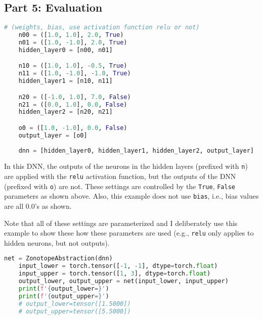 \subsection{Part 5: Evaluation}


\begin{lstlisting}[language=Python]
    # (weights, bias, use activation function relu or not)
    n00 = ([1.0, 1.0], 2.0, True)
    n01 = ([1.0, -1.0], 2.0, True)
    hidden_layer0 = [n00, n01]

    n10 = ([1.0, 1.0], -0.5, True)
    n11 = ([1.0, -1.0], -1.0, True)
    hidden_layer1 = [n10, n11]

    n20 = ([-1.0, 1.0], 7.0, False)
    n21 = ([0.0, 1.0], 0.0, False)
    hidden_layer2 = [n20, n21]

    o0 = ([1.0, -1.0], 0.0, False)
    output_layer = [o0]
    
    dnn = [hidden_layer0, hidden_layer1, hidden_layer2, output_layer]
\end{lstlisting}

In this DNN, the outputs of the neurons in the hidden layers (prefixed with \texttt{n}) are applied with the \texttt{relu} activation function, but the outputs of the DNN (prefixed with \texttt{o}) are not.  These settings are controlled by the \texttt{True}, \texttt{False} parameters as shown above.  Also, this example does not use \texttt{bias}, i.e., bias values are all 0.0's as shown. 

Note that all of these settings are parameterized and I deliberately use this example to show these how these parameters are used (e.g., \texttt{relu} only applies to hidden neurons, but not outputs).

\begin{lstlisting}[language=Python]
    net = ZonotopeAbstraction(dnn)
    input_lower = torch.tensor([-1, -1], dtype=torch.float)
    input_upper = torch.tensor([1, 3], dtype=torch.float)
    output_lower, output_upper = net(input_lower, input_upper)
    print(f'{output_lower=}')
    print(f'{output_upper=}')
    # output_lower=tensor([1.5000])
    # output_upper=tensor([5.5000])
\end{lstlisting}
